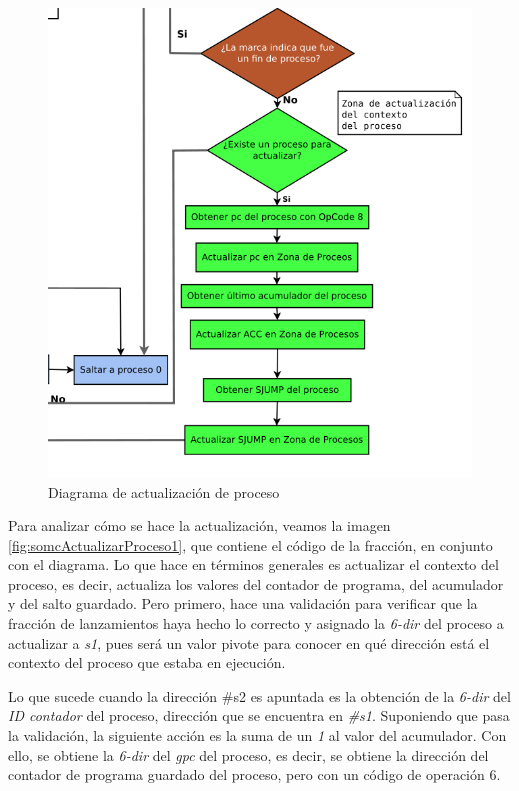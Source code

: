 \documentclass[letterpaper,12pt,oneside]{book}
\begin{document}
		\begin{figure}[ht]		
			\centering
			\includegraphics[scale=0.6]{media/CARDIACC/DiagActualizacionProcess.png}
			\caption{ Diagrama de actualización de proceso}
			\label{fig:diagActualProccess1}
		\end{figure}		
		
		Para analizar cómo se hace la actualización, veamos la imagen  \ref{fig:somcActualizarProceso1},	que contiene el código de la fracción,
		en conjunto con el diagrama. Lo
		que hace en términos generales es actualizar el contexto del proceso, es decir, actualiza los valores del contador de programa, 
		del acumulador y del
		salto guardado. Pero primero, hace una validación para verificar que la fracción de lanzamientos haya hecho lo correcto y 
		asignado la \textit{6-dir} del proceso a actualizar a \textit{s1}, pues
		será un valor pivote para conocer en qué dirección está el contexto del proceso que estaba en ejecución.
  
        Lo que sucede cuando la dirección \#s2 es apuntada es la obtención de
		la \textit{6-dir} del \textit{ID contador} del proceso, dirección que se encuentra en \textit{\#s1}. Suponiendo que pasa la validación, 
		la siguiente acción es la
		suma de un \textit{1} al valor del acumulador. Con ello,
		se obtiene la \textit{6-dir} del \textit{gpc} del proceso, es decir, se obtiene la dirección del contador de programa guardado del proceso,
		pero con un código de operación 6.
  
\end{document}
